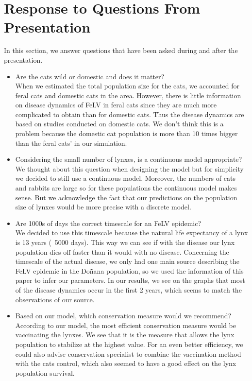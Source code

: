\documentclass[12pt]{article}
\begin{document}
\section{Response to Questions From Presentation}

\quad In this section, we answer questions that have been asked during and after the presentation.

\begin{itemize}
    \item Are the cats wild or domestic and does it matter?\\
    When we estimated the total population size for the cats, we accounted for feral cats and domestic cats in the area. However, there is little information on disease dynamics of FeLV in feral cats since they are much more complicated to obtain than for domestic cats. Thus the disease dynamics are based on studies conducted on domestic cats. We don't think this is a problem because the domestic cat population is more than 10 times bigger than the feral cats' in our simulation. 
    \item Considering the small number of lynxes, is a continuous model appropriate?\\
    We thought about this question when designing the model but for simplicity we decided to still use a continuous model. Moreover, the numbers of cats and rabbits are large so for these populations the continuous model makes sense. But we acknowledge the fact that our predictions on the population size of lynxes would be more precise with a discrete model.
    \item Are 1000s of days the correct timescale for an FeLV epidemic?\\
    We decided to use this timescale because the natural life expectancy of a lynx is 13 years (~5000 days). This way we can see if with the disease our lynx population dies off faster than it would with no disease. Concerning the timescale of the actual disease, we only had one main source describing the FeLV epidemic in the Doñana population, so we used the information of this paper to infer our parameters. In our results, we see on the graphs that most of the disease dynamics occur in the first 2 years, which seems to match the observations of our source.
    \item Based on our model, which conservation measure would we recommend?\\
    According to our model, the most efficient conservation measure would be vaccinating the lynxes. We see that it is the measure that allows the lynx population to stabilize at the highest value. For an even better efficiency, we could also advise conservation specialist to combine the vaccination method with the cats control, which also seemed to have a good effect on the lynx population survival.
\end{itemize}
\end{document}

